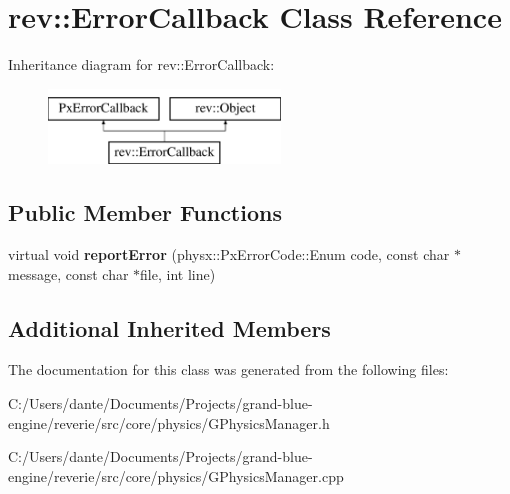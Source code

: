 \hypertarget{classrev_1_1_error_callback}{}\section{rev\+::Error\+Callback Class Reference}
\label{classrev_1_1_error_callback}
Inheritance diagram for rev\+::Error\+Callback\+:\begin{figure}[H]
\begin{center}
\leavevmode
\includegraphics[height=2.000000cm]{classrev_1_1_error_callback}
\end{center}
\end{figure}
\subsection*{Public Member Functions}
\begin{DoxyCompactItemize}
\item 
\mbox{\label{classrev_1_1_error_callback_a08ad71f3fd2913737eabbbcf049c820e}} 
virtual void {\bfseries report\+Error} (physx\+::\+Px\+Error\+Code\+::\+Enum code, const char $\ast$message, const char $\ast$file, int line)
\end{DoxyCompactItemize}
\subsection*{Additional Inherited Members}


The documentation for this class was generated from the following files\+:\begin{DoxyCompactItemize}
\item 
C\+:/\+Users/dante/\+Documents/\+Projects/grand-\/blue-\/engine/reverie/src/core/physics/G\+Physics\+Manager.\+h\item 
C\+:/\+Users/dante/\+Documents/\+Projects/grand-\/blue-\/engine/reverie/src/core/physics/G\+Physics\+Manager.\+cpp\end{DoxyCompactItemize}

